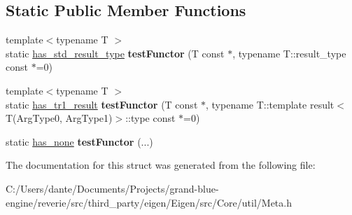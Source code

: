 \subsection*{Static Public Member Functions}
\begin{DoxyCompactItemize}
\item 
\mbox{\label{struct_eigen_1_1internal_1_1result__of_3_01_func_07_arg_type0_00_01_arg_type1_08_4_ac01536f71856aa83a6c5f16ec960c38a}} 
{\footnotesize template$<$typename T $>$ }\\static \mbox{\hyperlink{struct_eigen_1_1internal_1_1has__std__result__type}{has\+\_\+std\+\_\+result\+\_\+type}} {\bfseries test\+Functor} (T const $\ast$, typename T\+::result\+\_\+type const $\ast$=0)
\item 
\mbox{\label{struct_eigen_1_1internal_1_1result__of_3_01_func_07_arg_type0_00_01_arg_type1_08_4_aa1cb85adf69c0fcd326bdc7080ab0d81}} 
{\footnotesize template$<$typename T $>$ }\\static \mbox{\hyperlink{struct_eigen_1_1internal_1_1has__tr1__result}{has\+\_\+tr1\+\_\+result}} {\bfseries test\+Functor} (T const $\ast$, typename T\+::template result$<$ T(Arg\+Type0, Arg\+Type1)$>$\+::type const $\ast$=0)
\item 
\mbox{\label{struct_eigen_1_1internal_1_1result__of_3_01_func_07_arg_type0_00_01_arg_type1_08_4_a583c311eaa5282bc065a1e379d2b8031}} 
static \mbox{\hyperlink{struct_eigen_1_1internal_1_1has__none}{has\+\_\+none}} {\bfseries test\+Functor} (...)
\end{DoxyCompactItemize}


The documentation for this struct was generated from the following file\+:\begin{DoxyCompactItemize}
\item 
C\+:/\+Users/dante/\+Documents/\+Projects/grand-\/blue-\/engine/reverie/src/third\+\_\+party/eigen/\+Eigen/src/\+Core/util/Meta.\+h\end{DoxyCompactItemize}
